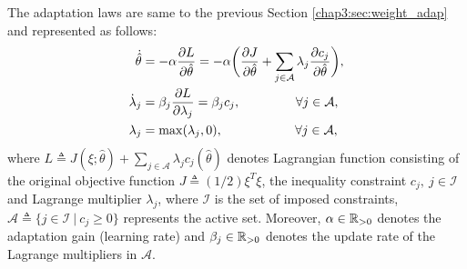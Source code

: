 The adaptation laws are same to the previous Section \ref{chap3:sec:weight_adap} and represented as follows:
\begin{align}
    \dot {\hat\theta}&=-\alpha {\partial L\over\partial \hat\theta}
    =-\alpha 
    \bigg(
    {\partial J\over \partial \hat\theta}+\sum_{j\in\mathcal{A}}
    \lambda_j {\partial c_j\over\partial \hat\theta}
    \bigg),
\label{chap4:eq:adap_th}
    \\
    \dot\lambda_j& = \beta_j{\partial L\over\partial \lambda_j} = \beta_j c_j ,
    \quad\quad\quad\quad      \      
    \forall j\in\mathcal A,
\label{chap4:eq:adap_L}
    \\
    \lambda_j & = \max(\lambda_j,0) ,
    \quad\quad\quad\quad\ \ \ \ \ 
    \forall j\in\mathcal A,
\label{chap4:eq:adap_L_max}
\end{align}
where $L\triangleq J(\xi;\hat\theta)+\sum_{j\in\mathcal A}\lambda_j c_j(\hat\theta)$ denotes Lagrangian function consisting of the original objective function $J\triangleq(1/2)\xi^T\xi$, the inequality constraint $c_j,\ j\in\mathcal I$ and Lagrange multiplier $\lambda_j$, where $\mathcal I$ is the set of imposed constraints, $\mathcal A \triangleq \{j\in\mathcal I\ |\ c_j\ge 0\}$ represents the active set.
Moreover, $\alpha\in\mathbb{R}_{>0}$ denotes the adaptation gain (learning rate) and $\beta_j\in\mathbb{R}_{>0}$ denotes the update rate of the Lagrange multipliers in $\mathcal A$. 


